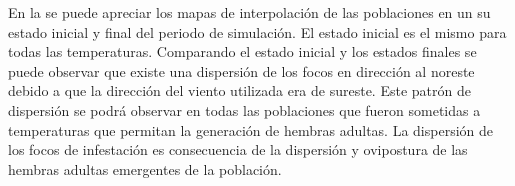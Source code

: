 En la  se puede apreciar los mapas de interpolación de las
poblaciones en un su estado inicial y final del periodo de simulación. El estado inicial es el
mismo para todas las temperaturas. Comparando el estado inicial y los estados finales se puede
observar que existe una dispersión de los focos en dirección al noreste debido a que la dirección
del viento utilizada era de sureste. Este patrón de dispersión se podrá observar en todas las
poblaciones que fueron sometidas a temperaturas que permitan la generación de hembras adultas. La
dispersión de los focos de infestación es consecuencia de la dispersión y ovipostura de las
hembras adultas emergentes de la población.

